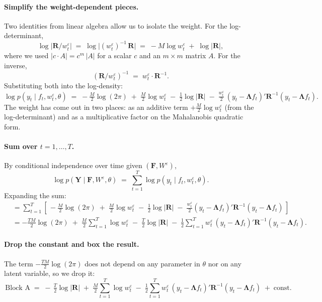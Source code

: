 \documentclass[11pt, a4paper, oneside]{article}
\newcommand{\mY}{\mathbf{Y}}
\newcommand{\mF}{\mathbf{F}}
\newcommand{\mL}{\boldsymbol{\Lambda}}
\newcommand{\mR}{\mathbf{R}}
\begin{document}
\paragraph{Simplify the weight-dependent pieces.}
Two identities from linear algebra allow us to isolate the weight. For
the log-determinant,
\[
\log\!\big|\mR/w^\varepsilon_t\big|
\;=\; \log\!\big|(w^\varepsilon_t)^{-1}\,\mR\big|
\;=\; -M \log w^\varepsilon_t \;+\; \log|\mR|,
\]
where we used $|c \cdot A| = c^m\, |A|$ for a scalar $c$ and an
$m \times m$ matrix $A$. For the inverse,
\[
(\mR/w^\varepsilon_t)^{-1} \;=\; w^\varepsilon_t \cdot \mR^{-1}.
\]
Substituting both into the log-density:
\[
\log p(y_t \mid f_t, w^\varepsilon_t, \theta)
\;=\; -\tfrac{M}{2}\log(2\pi) \;+\; \tfrac{M}{2}\log w^\varepsilon_t \;-\; \tfrac{1}{2}\log|\mR|
\;-\; \tfrac{w^\varepsilon_t}{2}\,(y_t - \mL f_t)'\mR^{-1}(y_t - \mL f_t).
\]
The weight has come out in two places: as an additive term
$+\tfrac{M}{2}\log w^\varepsilon_t$ (from the log-determinant) and as a
multiplicative factor on the Mahalanobis quadratic form.

\paragraph{Sum over $t = 1, \ldots, T$.}
By conditional independence over time given $(\mF, W^\varepsilon)$,
\[
\log p(\mY \mid \mF, W^\varepsilon, \theta)
\;=\; \sum_{t=1}^{T} \log p(y_t \mid f_t, w^\varepsilon_t, \theta).
\]
Expanding the sum:
\begin{align*}
&= \sum_{t=1}^{T} \left[\, -\tfrac{M}{2}\log(2\pi)
\;+\; \tfrac{M}{2}\log w^\varepsilon_t
\;-\; \tfrac{1}{2}\log|\mR|
\;-\; \tfrac{w^\varepsilon_t}{2}(y_t - \mL f_t)'\mR^{-1}(y_t - \mL f_t) \,\right] \\[4pt]
&= -\tfrac{TM}{2}\log(2\pi)
\;+\; \tfrac{M}{2}\sum_{t=1}^{T} \log w^\varepsilon_t
\;-\; \tfrac{T}{2}\log|\mR|
\;-\; \tfrac{1}{2}\sum_{t=1}^{T} w^\varepsilon_t\,(y_t - \mL f_t)'\mR^{-1}(y_t - \mL f_t).
\end{align*}

\paragraph{Drop the constant and box the result.}
The term $-\tfrac{TM}{2}\log(2\pi)$ does not depend on any parameter in
$\theta$ nor on any latent variable, so we drop it:
\begin{equation}
\boxed{\,
\text{Block A} \;=\;
-\,\tfrac{T}{2}\log|\mR|
\;+\; \tfrac{M}{2}\sum_{t=1}^{T} \log w^\varepsilon_t
\;-\; \tfrac{1}{2}\sum_{t=1}^{T} w^\varepsilon_t\, (y_t - \mL f_t)'\mR^{-1}(y_t - \mL f_t) \;+\; \text{const}.
\,}
\label{eq:block-A}
\end{equation}
\end{document}
